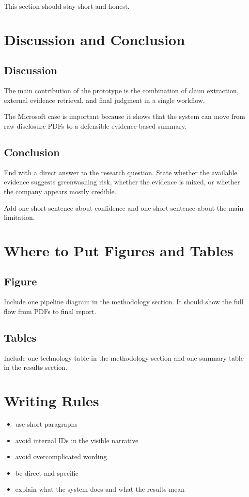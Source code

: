 This section should stay short and honest.

\section{Discussion and Conclusion}

\subsection{Discussion}

The main contribution of the prototype is the combination of claim extraction, external evidence retrieval, and final judgment in a single workflow.

The Microsoft case is important because it shows that the system can move from raw disclosure PDFs to a defensible evidence-based summary.

\subsection{Conclusion}

End with a direct answer to the research question. State whether the available evidence suggests greenwashing risk, whether the evidence is mixed, or whether the company appears mostly credible.

Add one short sentence about confidence and one short sentence about the main limitation.

\section{Where to Put Figures and Tables}

\subsection{Figure}

Include one pipeline diagram in the methodology section. It should show the full flow from PDFs to final report.

\subsection{Tables}

Include one technology table in the methodology section and one summary table in the results section.

\section{Writing Rules}

\begin{itemize}
    \item use short paragraphs
    \item avoid internal IDs in the visible narrative
    \item avoid overcomplicated wording
    \item be direct and specific
    \item explain what the system does and what the results mean
\end{itemize}

